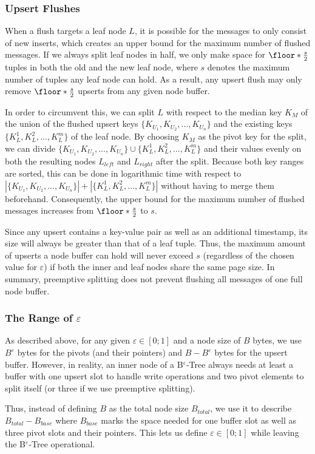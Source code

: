 \subsubsection{Upsert Flushes}
When a flush targets a leaf node $L$, it is possible for the messages to only consist of new inserts, which creates an upper bound for the maximum number of flushed messages. If we always split leaf nodes in half, we only make space for $\floor*{\frac{s}{2}}$ tuples in both the old and the new leaf node, where $s$ denotes the maximum number of tuples any leaf node can hold. As a result, any upsert flush may only remove $\floor*{\frac{s}{2}}$ upserts from any given node buffer.

In order to circumvent this, we can split $L$ with respect to the median key $K_M$ of the union of the flushed upsert keys $\{K_{U_1}, K_{U_2}, ..., K_{U_n}\}$ and the existing keys $\{K^1_L, K^2_L, ..., K^m_L\}$ of the leaf node. By choosing $K_M$ as the pivot key for the split, we can divide $\{K_{U_1}, K_{U_2}, ..., K_{U_n}\} \cup \{K^1_L, K^2_L, ..., K^m_L\}$ and their values evenly on both the resulting nodes $L_{left}$ and $L_{right}$ after the split. Because both key ranges are sorted, this can be done in logarithmic time with respect to $|\{K_{U_1}, K_{U_2}, ..., K_{U_n}\}| + |\{K^1_L, K^2_L, ..., K^m_L\}|$ without having to merge them beforehand. Consequently, the upper bound for the maximum number of flushed messages increases from $\floor*{\frac{s}{2}}$ to $s$.

Since any upsert contains a key-value pair as well as an additional timestamp, its size will always be greater than that of a leaf tuple. Thus, the maximum amount of upserts a node buffer can hold will never exceed $s$ (regardless of the chosen value for $\varepsilon$) if both the inner and leaf nodes share the same page size. In summary, preemptive splitting does not prevent flushing all messages of one full node buffer.

\subsubsection{The Range of $\varepsilon$}
As described above, for any given $\varepsilon \in [0;1]$ and a node size of $B$ bytes, we use $B^\varepsilon$ bytes for the pivots (and their pointers) and $B - B^\varepsilon$ bytes for the upsert buffer. However, in reality, an inner node of a B$^\varepsilon$-Tree always needs at least a buffer with one upsert slot to handle write operations and two pivot elements to split itself (or three if we use preemptive splitting).

Thus, instead of defining $B$ as the total node size $B_{total}$, we use it to describe $B_{total} - B_{base}$ where $B_{base}$ marks the space needed for one buffer slot as well as three pivot slots and their pointers. This lets us define $\varepsilon \in [0;1]$ while leaving the B$^\varepsilon$-Tree operational.


